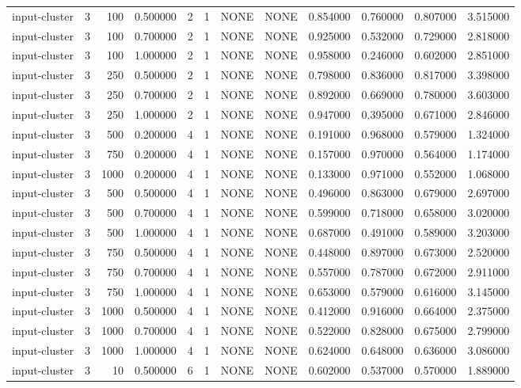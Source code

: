 \begin{tabular}{lrrrllllrrrr}
input-cluster & 3 & 100 & 0.500000 & 2 & 1 & NONE & NONE & 0.854000 & 0.760000 & 0.807000 & 3.515000 \\
input-cluster & 3 & 100 & 0.700000 & 2 & 1 & NONE & NONE & 0.925000 & 0.532000 & 0.729000 & 2.818000 \\
input-cluster & 3 & 100 & 1.000000 & 2 & 1 & NONE & NONE & 0.958000 & 0.246000 & 0.602000 & 2.851000 \\
input-cluster & 3 & 250 & 0.500000 & 2 & 1 & NONE & NONE & 0.798000 & 0.836000 & 0.817000 & 3.398000 \\
input-cluster & 3 & 250 & 0.700000 & 2 & 1 & NONE & NONE & 0.892000 & 0.669000 & 0.780000 & 3.603000 \\
input-cluster & 3 & 250 & 1.000000 & 2 & 1 & NONE & NONE & 0.947000 & 0.395000 & 0.671000 & 2.846000 \\
input-cluster & 3 & 500 & 0.200000 & 4 & 1 & NONE & NONE & 0.191000 & 0.968000 & 0.579000 & 1.324000 \\
input-cluster & 3 & 750 & 0.200000 & 4 & 1 & NONE & NONE & 0.157000 & 0.970000 & 0.564000 & 1.174000 \\
input-cluster & 3 & 1000 & 0.200000 & 4 & 1 & NONE & NONE & 0.133000 & 0.971000 & 0.552000 & 1.068000 \\
input-cluster & 3 & 500 & 0.500000 & 4 & 1 & NONE & NONE & 0.496000 & 0.863000 & 0.679000 & 2.697000 \\
input-cluster & 3 & 500 & 0.700000 & 4 & 1 & NONE & NONE & 0.599000 & 0.718000 & 0.658000 & 3.020000 \\
input-cluster & 3 & 500 & 1.000000 & 4 & 1 & NONE & NONE & 0.687000 & 0.491000 & 0.589000 & 3.203000 \\
input-cluster & 3 & 750 & 0.500000 & 4 & 1 & NONE & NONE & 0.448000 & 0.897000 & 0.673000 & 2.520000 \\
input-cluster & 3 & 750 & 0.700000 & 4 & 1 & NONE & NONE & 0.557000 & 0.787000 & 0.672000 & 2.911000 \\
input-cluster & 3 & 750 & 1.000000 & 4 & 1 & NONE & NONE & 0.653000 & 0.579000 & 0.616000 & 3.145000 \\
input-cluster & 3 & 1000 & 0.500000 & 4 & 1 & NONE & NONE & 0.412000 & 0.916000 & 0.664000 & 2.375000 \\
input-cluster & 3 & 1000 & 0.700000 & 4 & 1 & NONE & NONE & 0.522000 & 0.828000 & 0.675000 & 2.799000 \\
input-cluster & 3 & 1000 & 1.000000 & 4 & 1 & NONE & NONE & 0.624000 & 0.648000 & 0.636000 & 3.086000 \\
input-cluster & 3 & 10 & 0.500000 & 6 & 1 & NONE & NONE & 0.602000 & 0.537000 & 0.570000 & 1.889000 \\

\end{tabular}
